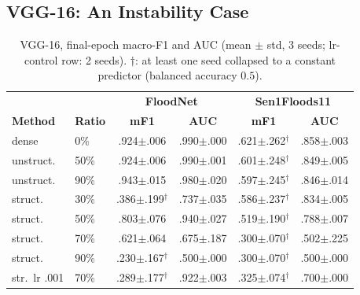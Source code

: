\documentclass[conference]{IEEEtran}
\newif\ifreview
\newcommand{\REV}[1]{\ifreview\textcolor{red}{\textbf{[Revise: #1]}}\fi}
\begin{document}
\subsection{VGG-16: An Instability Case}
\begin{table}[t]
\centering
\caption{VGG-16, final-epoch macro-F1 and AUC (mean $\pm$ std, 3
seeds; lr-control row: 2 seeds). $\dagger$: at least one seed
collapsed to a constant predictor (balanced accuracy $0.5$).}
\label{tab:vgg}
\footnotesize
\setlength{\tabcolsep}{2.6pt}
\begin{tabular}{llcc cc}
\toprule
& & \multicolumn{2}{c}{\textbf{FloodNet}} &
\multicolumn{2}{c}{\textbf{Sen1Floods11}}\\
\cmidrule(lr){3-4}\cmidrule(lr){5-6}
\textbf{Method} & \textbf{Ratio} & \textbf{mF1} & \textbf{AUC} &
\textbf{mF1} & \textbf{AUC}\\
\midrule
dense      & 0\%  & .924$\pm$.006 & .990$\pm$.000 & .621$\pm$.262$^\dagger$ & .858$\pm$.003\\
unstruct.  & 50\% & .924$\pm$.006 & .990$\pm$.001 & .601$\pm$.248$^\dagger$ & .849$\pm$.005\\
unstruct.  & 90\% & .943$\pm$.015 & .980$\pm$.020 & .597$\pm$.245$^\dagger$ & .846$\pm$.014\\
struct.    & 30\% & .386$\pm$.199$^\dagger$ & .737$\pm$.035 & .586$\pm$.237$^\dagger$ & .834$\pm$.005\\
struct.    & 50\% & .803$\pm$.076 & .940$\pm$.027 & .519$\pm$.190$^\dagger$ & .788$\pm$.007\\
struct.    & 70\% & .621$\pm$.064 & .675$\pm$.187 & .300$\pm$.070$^\dagger$ & .502$\pm$.225\\
struct.    & 90\% & .230$\pm$.167$^\dagger$ & .500$\pm$.000 & .300$\pm$.070$^\dagger$ & .500$\pm$.000\\
\midrule
str.\ lr .001 & 70\% & .289$\pm$.177$^\dagger$ & .922$\pm$.003 & .325$\pm$.074$^\dagger$ & .700$\pm$.000\\
\bottomrule
\end{tabular}
\end{table}
\REV{[A2] Check the daggers against the text: the text lists collapses
at ``90\% on FloodNet, 70--90\% on Sen1Floods11, and sporadically at
30\% on FloodNet'', but the table also marks SAR dense, SAR unstruct.\
50/90\%, SAR struct.\ 30/50\%, and the lr-control row. Make text and
table agree. Also: FloodNet struct.\ 30\% (.386) is worse than 50\%
(.803) -- non-monotone; explain (one collapsed seed?) or show per-seed.
The lr-control row has mF1 .289 but AUC .922 on FloodNet: another
threshold-pathology example worth one sentence. Same std convention
issue as in Sec.~III-B.}
\end{document}
